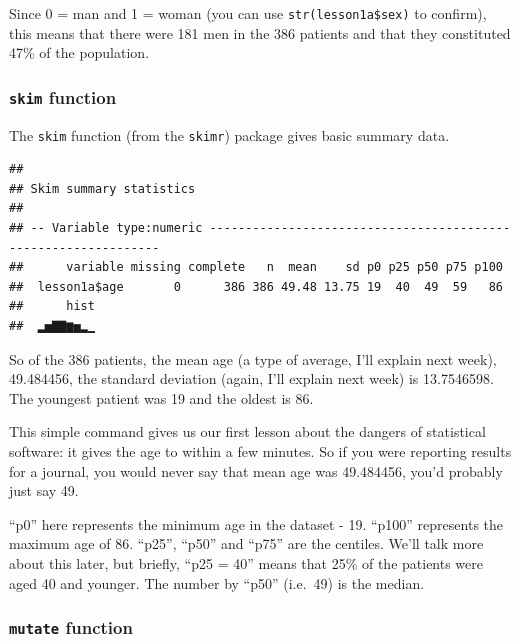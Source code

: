 \documentclass[]{book}
\newenvironment{Shaded}{\begin{snugshade}}{\end{snugshade}}
\newcommand{\KeywordTok}[1]{\textcolor[rgb]{0.13,0.29,0.53}{\textbf{#1}}}
\newcommand{\NormalTok}[1]{#1}
\newcommand{\OperatorTok}[1]{\textcolor[rgb]{0.81,0.36,0.00}{\textbf{#1}}}
\begin{document}
Since 0 = man and 1 = woman (you can use \texttt{str(lesson1a\$sex)} to
confirm), this means that there were 181 men in the 386 patients and
that they constituted 47\% of the population.

\hypertarget{skim-function}{%
\subsubsection{\texorpdfstring{\texttt{skim}
function}{skim function}}\label{skim-function}}

The \texttt{skim} function (from the \texttt{skimr}) package gives basic
summary data.

\begin{Shaded}
\end{Shaded}

\begin{verbatim}
## 
## Skim summary statistics
## 
## -- Variable type:numeric ---------------------------------------------------------------
##      variable missing complete   n  mean    sd p0 p25 p50 p75 p100
##  lesson1a$age       0      386 386 49.48 13.75 19  40  49  59   86
##      hist
##  ▂▅▇▇▆▅▂▁
\end{verbatim}

So of the 386 patients, the mean age (a type of average, I'll explain
next week), 49.484456, the standard deviation (again, I'll explain next
week) is 13.7546598. The youngest patient was 19 and the oldest is 86.

This simple command gives us our first lesson about the dangers of
statistical software: it gives the age to within a few minutes. So if
you were reporting results for a journal, you would never say that mean
age was 49.484456, you'd probably just say 49.

``p0'' here represents the minimum age in the dataset - 19. ``p100''
represents the maximum age of 86. ``p25'', ``p50'' and ``p75'' are the
centiles. We'll talk more about this later, but briefly, ``p25 = 40''
means that 25\% of the patients were aged 40 and younger. The number by
``p50'' (i.e.~49) is the median.

\hypertarget{mutate-function}{%
\subsubsection{\texorpdfstring{\texttt{mutate}
function}{mutate function}}\label{mutate-function}}
\end{document}
